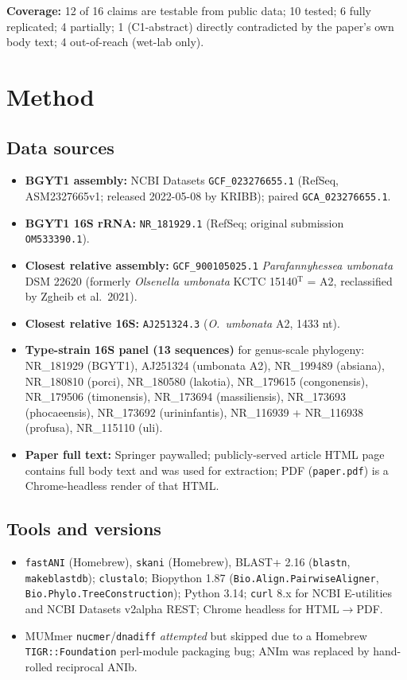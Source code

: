 \documentclass[11pt]{article}
\begin{document}
\textbf{Coverage:} 12 of 16 claims are testable from public data; 10 tested; 6 fully replicated; 4 partially; 1 (C1-abstract) directly contradicted by the paper's own body text; 4 out-of-reach (wet-lab only).

\section{Method}

\subsection{Data sources}
\begin{itemize}
\item \textbf{BGYT1 assembly:} NCBI Datasets \texttt{GCF\_023276655.1} (RefSeq, ASM2327665v1; released 2022-05-08 by KRIBB); paired \texttt{GCA\_023276655.1}.
\item \textbf{BGYT1 16S rRNA:} \texttt{NR\_181929.1} (RefSeq; original submission \texttt{OM533390.1}).
\item \textbf{Closest relative assembly:} \texttt{GCF\_900105025.1} \emph{Parafannyhessea umbonata} DSM 22620 (formerly \emph{Olsenella umbonata} KCTC 15140${}^{\mathrm{T}}$ = A2, reclassified by Zgheib et al.\ 2021).
\item \textbf{Closest relative 16S:} \texttt{AJ251324.3} (\emph{O.\ umbonata} A2, 1433 nt).
\item \textbf{Type-strain 16S panel (13 sequences)} for genus-scale phylogeny: NR\_181929 (BGYT1), AJ251324 (umbonata A2), NR\_199489 (absiana), NR\_180810 (porci), NR\_180580 (lakotia), NR\_179615 (congonensis), NR\_179506 (timonensis), NR\_173694 (massiliensis), NR\_173693 (phocaeensis), NR\_173692 (urininfantis), NR\_116939 + NR\_116938 (profusa), NR\_115110 (uli).
\item \textbf{Paper full text:} Springer paywalled; publicly-served article HTML page contains full body text and was used for extraction; PDF (\texttt{paper.pdf}) is a Chrome-headless render of that HTML.
\end{itemize}

\subsection{Tools and versions}
\begin{itemize}
\item \texttt{fastANI} (Homebrew), \texttt{skani} (Homebrew), BLAST+ 2.16 (\texttt{blastn}, \texttt{makeblastdb}); \texttt{clustalo}; Biopython 1.87 (\texttt{Bio.Align.PairwiseAligner}, \texttt{Bio.Phylo.TreeConstruction}); Python 3.14; \texttt{curl} 8.x for NCBI E-utilities and NCBI Datasets v2alpha REST; Chrome headless for HTML$\to$PDF.
\item MUMmer \texttt{nucmer}/\texttt{dnadiff} \emph{attempted} but skipped due to a Homebrew \texttt{TIGR::Foundation} perl-module packaging bug; ANIm was replaced by hand-rolled reciprocal ANIb.
\end{itemize}
\end{document}
